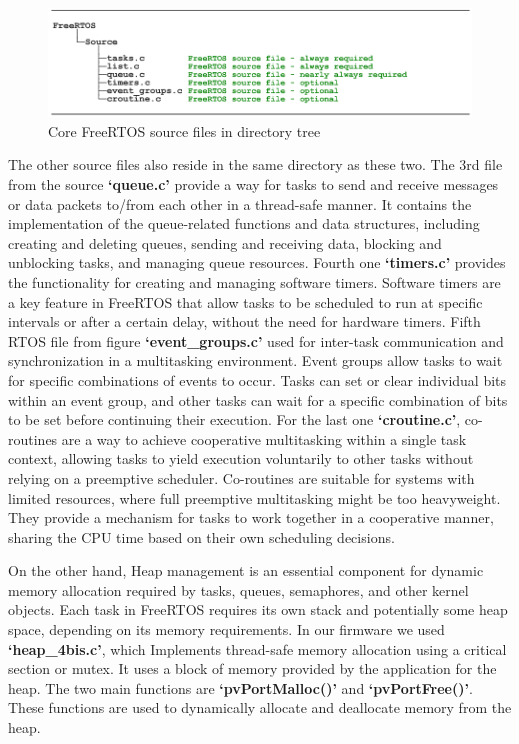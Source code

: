 \begin{figure}[htbp]
\centering
\includegraphics[scale=0.9]{images/FreeRTOS.png}
\caption{Core FreeRTOS source files in directory tree }
\label{fig:x RTOS Tree}
\end{figure}
The other source files also reside in the same directory as these two. The 3rd file from the source \textbf{‘queue.c’} provide a way for tasks to send and receive messages or data packets to/from each other in a thread-safe manner. It contains the implementation of the queue-related functions and data structures, including creating and deleting queues, sending and receiving data, blocking and unblocking tasks, and managing queue resources. Fourth one \textbf{‘timers.c’} provides the functionality for creating and managing software timers. Software timers are a key feature in FreeRTOS that allow tasks to be scheduled to run at specific intervals or after a certain delay, without the need for hardware timers. Fifth RTOS file from figure \textbf{‘event\_groups.c’} used for inter-task communication and synchronization in a multitasking environment. Event groups allow tasks to wait for specific combinations of events to occur. Tasks can set or clear individual bits within an event group, and other tasks can wait for a specific combination of bits to be set before continuing their execution. For the last one
\textbf{‘croutine.c’}, co-routines are a way to achieve cooperative multitasking within a single task context, allowing tasks to yield execution voluntarily to other tasks without relying on a preemptive scheduler. Co-routines are suitable for systems with limited resources, where full preemptive multitasking might be too heavyweight. They provide a mechanism for tasks to work together in a cooperative manner, sharing the CPU time based on their own scheduling decisions.\par
\vspace{0.5cm}\par
On the other hand, Heap management is an essential component for dynamic memory allocation required by tasks, queues, semaphores, and other kernel objects. Each task in FreeRTOS requires its own stack and potentially some heap space, depending on its memory requirements. In our firmware we used \textbf{‘heap\_4bis.c’}, which Implements thread-safe memory allocation using a critical section or mutex. It uses a block of memory provided by the application for the heap. The two main functions are \textbf{‘pvPortMalloc()’} and \textbf{‘pvPortFree()’}. These functions are used to dynamically allocate and deallocate memory from the heap.

